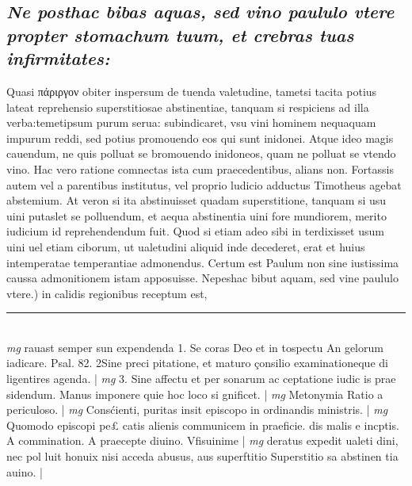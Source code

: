 \documentclass{article}
\begin{document}
\begin{pages}
\subsection*{\textit{Ne posthac bibas aquas, sed vino paululo vtere propter stomachum tuum, et crebras tuas infirmitates: }}\pstart Quasi πάριργον obiter inspersum de tuenda valetudine, tametsi tacita potius lateat reprehensio superstitiosae abstinentiae, tanquam si respiciens ad illa verba:temetipsum purum serua: subindicaret, vsu vini hominem nequaquam impurum reddi, sed potius promouendo eos qui sunt inidonei. Atque ideo magis cauendum, ne quis polluat se bromouendo inidoneos, quam ne polluat se vtendo vino. Hac vero ratione comnectas ista cum praecedentibus, alians non. Fortassis autem vel a parentibus institutus, vel proprio ludicio adductus Timotheus agebat abstemium. At veron si ita abstinuisset quadam superstitione, tanquam si usu uini putaslet se polluendum, et aequa abstinentia uini fore mundiorem, merito iudicium id reprehendendum fuit. Quod si etiam adeo sibi in terdixisset usum uini uel etiam ciborum, ut ualetudini aliquid inde decederet, erat et huius intemperatae temperantiae admonendus. Certum est Paulum non sine iustissima caussa admonitionem istam apposuisse.  \pend\pstart Nepeshac bibut aquam, sed vine paululo vtere.) in calidis regionibus receptum est,  \pend
\vspace{0.5cm}\noindent
\vspace{0.2cm}\rule{1cm}{0.2pt}\\ 
\hspace{0.2cm}\textit{mg}
\footnotesize rauast semper sun expendenda 1. Se coras Deo et in tospectu An gelorum iadicare. Psal. 82. 2Sine preci pitatione, et maturo çonsilio examinationeque di ligentires agenda. 
\normalsize| 
\hspace{0.2cm}\textit{mg}
\footnotesize 3. Sine affectu et per sonarum ac ceptatione iudic is prae sidendum. Manus imponere quie hoc loco si gnificet. 
\normalsize| 
\hspace{0.2cm}\textit{mg}
\footnotesize Metonymia Ratio a periculoso. 
\normalsize| 
\hspace{0.2cm}\textit{mg}
\footnotesize Consćienti, puritas insit episcopo in ordinandis ministris. 
\normalsize| 
\hspace{0.2cm}\textit{mg}
\footnotesize Quomodo episcopi pe£ catis alienis communicem in praeficie. dis malis e incptis. A commination. A praecepte diuino. Vfisuinime 
\normalsize| 
\hspace{0.2cm}\textit{mg}
\footnotesize deratus expedit ualeti dini, nec pol luit honuix nisi acceda abusus, aus superftitio Superstitio sa abstinen tia auino. 
\normalsize| 

\end{pages}
\end{document}
